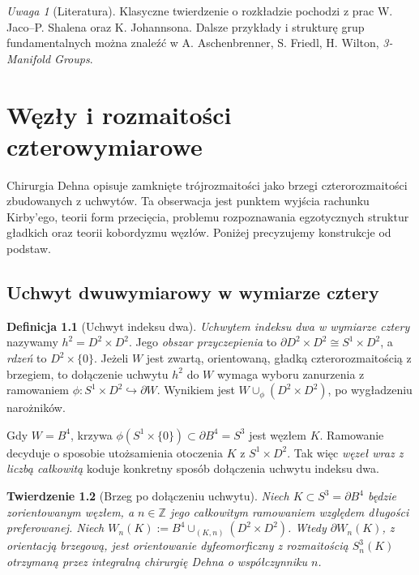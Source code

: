 \documentclass[11pt,a4paper]{report}
\numberwithin{equation}{section}
\theoremstyle{plain}
\newtheorem{twierdzenie}{Twierdzenie}[section]
\theoremstyle{definition}
\newtheorem{definicja}[twierdzenie]{Definicja}
\theoremstyle{remark}
\newtheorem{uwaga}[twierdzenie]{Uwaga}
\begin{document}
\begin{uwaga}[Literatura]
Klasyczne twierdzenie o rozkładzie pochodzi z prac
W. Jaco--P. Shalena oraz K. Johannsona.
Dalsze przykłady i strukturę grup fundamentalnych
można znaleźć w A. Aschenbrenner,
S. Friedl, H. Wilton, \emph{3-Manifold Groups}.
\end{uwaga}


\chapter{Węzły i rozmaitości czterowymiarowe}
\label{ch:kt-cztery}

Chirurgia Dehna opisuje zamknięte trójrozmaitości jako brzegi
czterorozmaitości zbudowanych z uchwytów. Ta obserwacja jest
punktem wyjścia rachunku Kirby'ego, teorii form przecięcia,
problemu rozpoznawania egzotycznych struktur gładkich oraz
teorii kobordyzmu węzłów. Poniżej precyzujemy konstrukcje
od podstaw.

\section{Uchwyt dwuwymiarowy w wymiarze cztery}
\label{sec:kt-uchwyty}

\begin{definicja}[Uchwyt indeksu dwa]
\emph{Uchwytem indeksu dwa w wymiarze cztery} nazywamy
$h^2=D^2\times D^2$. Jego \emph{obszar przyczepienia}
to $\partial D^2\times D^2\cong S^1\times D^2$,
a \emph{rdzeń} to $D^2\times\{0\}$.
Jeżeli $W$ jest zwartą, orientowaną, gładką czterorozmaitością
z brzegiem, to dołączenie uchwytu $h^2$ do $W$ wymaga
wyboru zanurzenia z ramowaniem
$\phi\colon S^1\times D^2\hookrightarrow\partial W$.
Wynikiem jest $W\cup_\phi(D^2\times D^2)$, po wygładzeniu
narożników.
\end{definicja}

Gdy $W=B^4$, krzywa $\phi(S^1\times\{0\})\subset\partial B^4=S^3$
jest węzłem $K$. Ramowanie decyduje o sposobie utożsamienia
otoczenia $K$ z $S^1\times D^2$. Tak więc \emph{węzeł wraz
z liczbą całkowitą} koduje konkretny sposób dołączenia
uchwytu indeksu dwa.

\begin{twierdzenie}[Brzeg po dołączeniu uchwytu]
Niech $K\subset S^3=\partial B^4$ będzie zorientowanym węzłem,
a $n\in\mathbb Z$ jego całkowitym ramowaniem względem długości
preferowanej. Niech
$W_n(K):=B^4\cup_{(K,n)}(D^2\times D^2)$.
Wtedy $\partial W_n(K)$, z orientacją brzegową, jest
orientowanie dyfeomorficzny z rozmaitością $S^3_n(K)$
otrzymaną przez integralną chirurgię Dehna o współczynniku $n$.
\end{twierdzenie}
\end{document}
